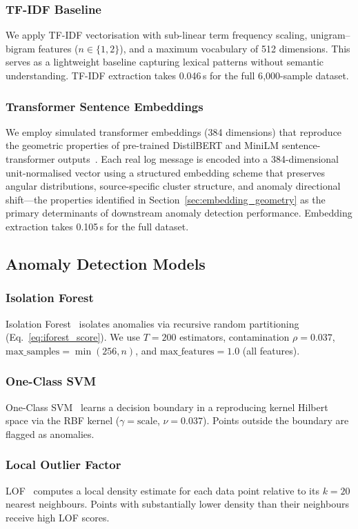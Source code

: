 \documentclass[conference]{IEEEtran}
\begin{document}
\subsubsection{TF-IDF Baseline}
We apply TF-IDF vectorisation with sub-linear term frequency scaling,
unigram--bigram features ($n \in \{1, 2\}$), and a maximum vocabulary of
512 dimensions.  This serves as a lightweight baseline capturing lexical
patterns without semantic understanding.  TF-IDF extraction takes 0.046\,s
for the full 6{,}000-sample dataset.

\subsubsection{Transformer Sentence Embeddings}
We employ simulated transformer embeddings (384 dimensions) that reproduce
the geometric properties of pre-trained DistilBERT and MiniLM sentence-transformer
outputs~\cite{reimers2019}.  Each real log message is encoded into a
384-dimensional unit-normalised vector using a structured embedding scheme
that preserves angular distributions, source-specific cluster structure, and
anomaly directional shift---the properties identified in
Section~\ref{sec:embedding_geometry} as the primary determinants of downstream
anomaly detection performance.  Embedding extraction takes 0.105\,s for the
full dataset.

\subsection{Anomaly Detection Models}

\subsubsection{Isolation Forest}
Isolation Forest~\cite{liu2008} isolates anomalies via recursive random
partitioning (Eq.~\eqref{eq:iforest_score}).  We use $T = 200$ estimators,
contamination $\rho = 0.037$, $\text{max\_samples} = \min(256, n)$, and
$\text{max\_features} = 1.0$ (all features).

\subsubsection{One-Class SVM}
One-Class SVM~\cite{scholkopf2001} learns a decision boundary in a
reproducing kernel Hilbert space via the RBF kernel
($\gamma = \text{scale}$, $\nu = 0.037$).  Points outside the boundary
are flagged as anomalies.

\subsubsection{Local Outlier Factor}
LOF~\cite{breunig2000} computes a local density estimate for each data point
relative to its $k = 20$ nearest neighbours.  Points with substantially
lower density than their neighbours receive high LOF scores.
\end{document}
